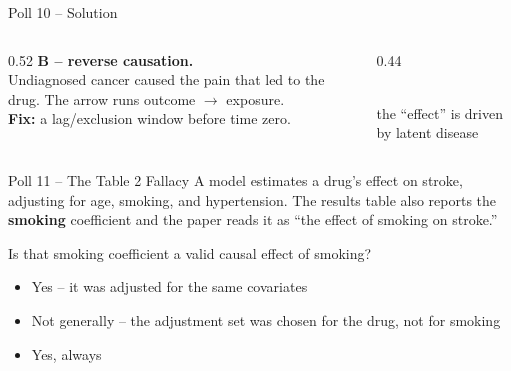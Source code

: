 \documentclass[aspectratio=169]{beamer}
\begin{document}
\begin{frame}{Poll 10 \;--\; Solution}
  \small
  \begin{columns}[T]
    \begin{column}{0.52\textwidth}
      \textcolor{good}{\textbf{B -- reverse causation.}}\\[0.4em]
      Undiagnosed cancer caused the pain that led to the drug. The arrow runs
      outcome $\to$ exposure.\\[0.3em]
      \textcolor{accent}{\textbf{Fix:}} a lag/exclusion window before time zero.
    \end{column}
    \begin{column}{0.44\textwidth}
      \centering
      \\[0.3em]
      {\scriptsize the ``effect'' is driven by latent disease}
    \end{column}
  \end{columns}
\end{frame}

\begin{frame}{Poll 11 \;--\; The Table 2 Fallacy}
  \small
  A model estimates a drug's effect on stroke, adjusting for age, smoking, and
  hypertension. The results table also reports the \textbf{smoking} coefficient
  and the paper reads it as ``the effect of smoking on stroke.''
  \vspace{0.8em}

  Is that smoking coefficient a valid causal effect of smoking?
  \begin{itemize}
    \item[\textbf{A.}] Yes -- it was adjusted for the same covariates
    \item[\textbf{B.}] Not generally -- the adjustment set was chosen for the drug, not for smoking
    \item[\textbf{C.}] Yes, always
  \end{itemize}
\end{frame}
\end{document}
